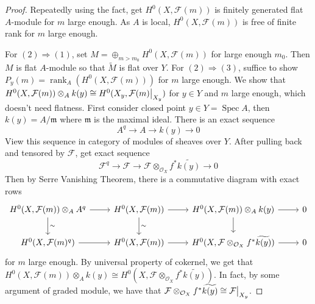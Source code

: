 \documentclass{ctexart}
\newcommand{\rank}{\operatorname{rank}}
\newcommand{\spec}{\operatorname{Spec}}
\begin{document}
\begin{proof}
    Repeatedly using the fact, get $H^{0}(X, \mathcal{F}(m))$ is finitely generated flat $A$-module for $m$ large enough.
    As $A$ is local, $H^{0}(X, \mathcal{F}(m))$ is free of finite rank for $m$ large enough.
    \par
    For $(2) \Rightarrow (1)$, set $M = \oplus_{m > m_{0}} H^{0}(X, \mathcal{F}(m))$ for large enough $m_{0}$.
    Then $M$ is flat $A$-module so that $\widetilde{M}$ is flat over $Y$.
    For $(2) \Rightarrow (3)$, suffice to show $P_{y}(m) = \rank_{A}(H^{0}(X, \mathcal{F}(m)))$ for $m$ large enough.
    We show that $H^{0}(X, \mathcal{F}(m)) \otimes_{A} k(y) \cong H^{0}(X_{y}, \mathcal{F}(m)\big{|}_{X_{y}})$ for $y\in Y$ and $m$ large enough, which doesn't need flatness.
    First consider closed point $y\in Y = \spec A$, then $k(y) = A/\mathfrak{m}$ where $\mathfrak{m}$ is the maximal ideal.
    There is an exact sequence
    \begin{equation*}
        A^{q} \longrightarrow A \longrightarrow k(y) \longrightarrow 0
    \end{equation*}
    View this sequence in category of modules of sheaves over $Y$.
    After pulling back and tensored by $\mathcal{F}$, get exact sequence
    \begin{equation*}
        \mathcal{F}^{q} \longrightarrow \mathcal{F} \longrightarrow \mathcal{F} \otimes_{\mathcal{O}_{X}} f^{\ast}\widetilde{k(y)} \longrightarrow 0
    \end{equation*}
    Then by Serre Vanishing Theorem, there is a commutative diagram with exact rows
    \begin{equation*}
        \begin{tikzcd}
            H^{0}(X, \mathcal{F}(m)) \otimes_{A} A^{q} \arrow[r] \arrow[d, "\sim"] &
            H^{0}(X, \mathcal{F}(m)) \arrow[r] \arrow[d, "\sim"] &
            H^{0}(X, \mathcal{F}(m)) \otimes_{A} k(y) \arrow[r] \arrow[d] &
            0 \\
            H^{0}(X, \mathcal{F}(m)^{q}) \arrow[r] &
            H^{0}(X, \mathcal{F}(m)) \arrow[r] &
            H^{0}(X, \mathcal{F} \otimes_{\mathcal{O}_{X}} f^{\ast}\widetilde{k(y)}) \arrow[r] &
            0 
        \end{tikzcd}
    \end{equation*}
    for $m$ large enough.
    By universal property of cokernel, we get that $H^{0}(X, \mathcal{F}(m)) \otimes_{A} k(y) \cong H^{0}(X, \mathcal{F} \otimes_{\mathcal{O}_{X}} f^{\ast}\widetilde{k(y)})$.
    In fact, by some argument of graded module, we have that $\mathcal{F} \otimes_{\mathcal{O}_{X}} f^{\ast}\widetilde{k(y)} \cong \mathcal{F}\big{|}_{X_{y}}$.

\end{proof}
\end{document}
